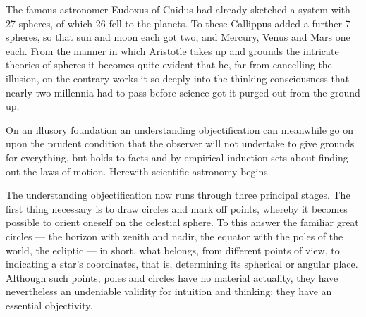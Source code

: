 \documentclass[12pt,a4paper]{book}
\begin{document}
The famous astronomer Eudoxus of Cnidus had already sketched a system with 27 spheres, of which 26 fell
to the planets. To these Callippus added a further 7 spheres, so that sun and moon each got two, and
Mercury, Venus and Mars one each. From the manner in which Aristotle takes up and grounds the intricate
theories of spheres it becomes quite evident that he, far from cancelling the illusion, on the contrary
works it so deeply into the thinking consciousness that nearly two millennia had to pass before science
got it purged out from the ground up.

On an illusory foundation an understanding objectification can meanwhile go on upon the prudent
condition that the observer will not undertake to give grounds for everything, but holds to facts and by
empirical induction
sets about finding out the laws of motion. Herewith scientific astronomy begins.

The understanding objectification now runs through three principal stages. The first thing necessary is
to draw circles and mark off points, whereby it becomes possible to orient oneself on the celestial
sphere. To this answer the familiar great circles --- the horizon with zenith and nadir, the equator with
the poles of the world, the ecliptic --- in short, what belongs, from different points of view, to
indicating a star's coordinates, that is, determining its spherical or angular place. Although such
points, poles and circles have no material actuality, they have nevertheless an undeniable validity for
intuition and thinking; they have an essential objectivity.
\end{document}
